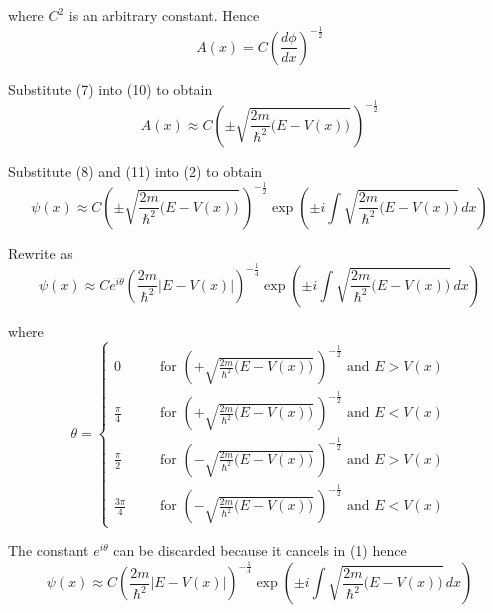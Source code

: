 where $C^2$ is an arbitrary constant. Hence
\begin{equation*}
A(x)=C\left(\frac{d\phi}{dx}\right)^{-\frac{1}{2}}
\tag{10}
\end{equation*}

Substitute (7) into (10) to obtain
\begin{equation*}
A(x)\approx C
\left(\pm\sqrt{\frac{2m}{\hbar^2}\bigl(E-V(x)\bigr)}\,\right)^{-\frac{1}{2}}
\tag{11}
\end{equation*}

Substitute (8) and (11) into (2) to obtain
\begin{equation*}
\psi(x)\approx C
\left(\pm\sqrt{\frac{2m}{\hbar^2}\bigl(E-V(x)\bigr)}\,\right)^{-\frac{1}{2}}
\exp\left(\pm i\int\sqrt{\frac{2m}{\hbar^2}\bigl(E-V(x)\bigr)}\,dx\right)
\end{equation*}

Rewrite as
\begin{equation*}
\psi(x)\approx Ce^{i\theta}
\left(\frac{2m}{\hbar^2}\bigl|E-V(x)\bigr|\right)^{-\frac{1}{4}}
\exp\left(\pm i\int\sqrt{\frac{2m}{\hbar^2}\bigl(E-V(x)\bigr)}\,dx\right)
\end{equation*}

where
\begin{equation*}
\theta=\left\{
\begin{aligned}
0& &
&\text{for $\left(+\sqrt{\frac{2m}{\hbar^2}\bigl(E-V(x)\bigr)}\,\right)^{-\frac{1}{2}}$ and $E>V(x)$}
\\[1ex]
\frac{\pi}{4}& &
&\text{for $\left(+\sqrt{\frac{2m}{\hbar^2}\bigl(E-V(x)\bigr)}\,\right)^{-\frac{1}{2}}$ and $E<V(x)$}
\\[1ex]
\frac{\pi}{2}& &
&\text{for $\left(-\sqrt{\frac{2m}{\hbar^2}\bigl(E-V(x)\bigr)}\,\right)^{-\frac{1}{2}}$ and $E>V(x)$}
\\[1ex]
\frac{3\pi}{4}& &
&\text{for $\left(-\sqrt{\frac{2m}{\hbar^2}\bigl(E-V(x)\bigr)}\,\right)^{-\frac{1}{2}}$ and $E<V(x)$}
\end{aligned}
\right.
\end{equation*}

The constant $e^{i\theta}$ can be discarded because it cancels in (1) hence
\begin{equation*}
\psi(x)\approx C
\left(\frac{2m}{\hbar^2}\bigl|E-V(x)\bigr|\right)^{-\frac{1}{4}}
\exp\left(\pm i\int\sqrt{\frac{2m}{\hbar^2}\bigl(E-V(x)\bigr)}\,dx\right)
\end{equation*}


